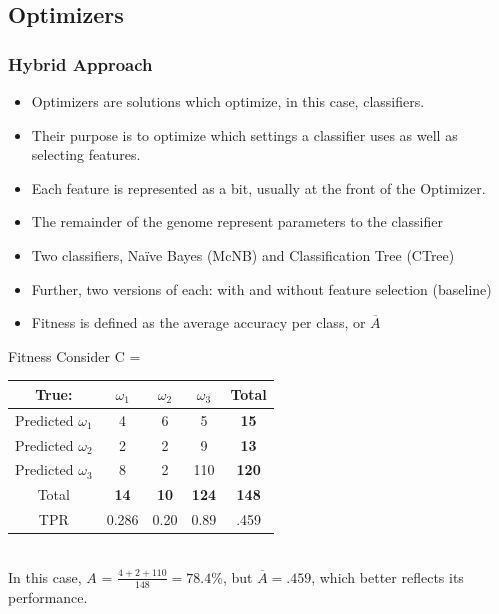 \documentclass{beamer}
\begin{document}
\subsection{Optimizers}
\begin{frame}
	\frametitle{Hybrid Approach}
	\begin{itemize}
		\item Optimizers are solutions which optimize, in this case, classifiers.
		\item Their purpose is to optimize which settings a classifier uses as well as selecting features.
		\item Each feature is represented as a bit, usually at the front of the Optimizer.
		\item The remainder of the genome represent parameters to the classifier
		\item Two classifiers, Na\"ive Bayes (McNB) and Classification Tree (CTree)
		\item Further, two versions of each: with and without feature selection (baseline)
		\item Fitness is defined as the average accuracy per class, or $\overline{A}$
	\end{itemize}
\end{frame}

\begin{frame}{Fitness}
	Consider C = \\\begin{tabular}{|c|c|c|c|c|}
		\hline
		True:&$\omega_1$&$\omega_2$&$\omega_3$&\textbf{Total}\\
		\hline
		Predicted $\omega_1$&4&6&5&\textbf{15}\\
		\hline
		Predicted $\omega_2$&2&2&9&\textbf{13}\\
		\hline
		Predicted $\omega_3$&8&2&110&\textbf{120}\\
		\hline
		Total&\textbf{14}&\textbf{10}&\textbf{124}&\textbf{148}\\
		TPR&0.286&0.20&0.89&.459\\
		\hline
	\end{tabular} 
\\In this case, $A$ = $\frac{4+2+110}{148} = 78.4\%$, but $\overline{A} = .459$, which better reflects its performance. 
\end{frame}
\end{document}
